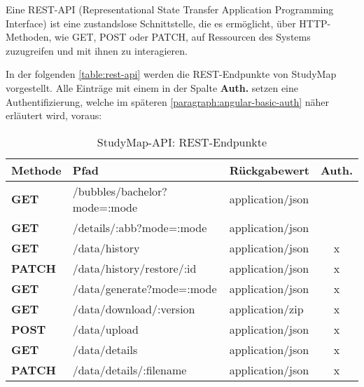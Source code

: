 Eine REST-API (Representational State Transfer Application Programming Interface) ist eine zustandslose Schnittstelle, die es ermöglicht, über HTTP-Methoden, wie GET, POST oder PATCH, auf Ressourcen des Systems zuzugreifen und mit ihnen zu interagieren.

\noindent
In der folgenden \autoref{table:rest-api} werden die REST-Endpunkte von StudyMap vorgestellt. Alle Einträge mit einem  in der Spalte \textbf{Auth.} setzen eine Authentifizierung, welche im späteren \autoref{paragraph:angular-basic-auth} näher erläutert wird, voraus:
\begin{table}[!ht]
    \centering
    \begin{tabular}{|l|l|l|c|}
    \hline
    \textbf{Methode} & \textbf{Pfad}                & \textbf{Rückgabewert} & \multicolumn{1}{l|}{\textbf{Auth.}} \\ \hline
    \textbf{GET}     & /bubbles/bachelor?mode=:mode & application/json      &                                     \\ \hline
    \textbf{GET}     & /details/:abb?mode=:mode     & application/json      &                                     \\ \hline
    \textbf{GET}     & /data/history                & application/json      & x                                   \\ \hline
    \textbf{PATCH}   & /data/history/restore/:id    & application/json      & x                                   \\ \hline
    \textbf{GET}     & /data/generate?mode=:mode    & application/json      & x                                   \\ \hline
    \textbf{GET}     & /data/download/:version      & application/zip       & x                                   \\ \hline
    \textbf{POST}    & /data/upload                 & application/json      & x                                   \\ \hline
    \textbf{GET}     & /data/details                & application/json      & x                                   \\ \hline
    \textbf{PATCH}   & /data/details/:filename      & application/json      & x                                   \\ \hline
    \end{tabular}

    \caption{StudyMap-API: REST-Endpunkte}
    \label{table:rest-api}
\end{table}

